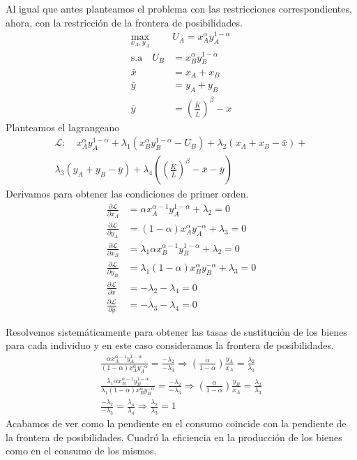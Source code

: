 Al igual que antes planteamos el problema con las restricciones correspondientes, ahora, con la restricción de la frontera de posibilidades.
\begin{align*}
    \max _{x_A,y_A} \quad & U_A = x_A^\alpha y_A^{1-\alpha} \\
    \text{s.a} \quad  U_B&= x_B^\alpha y_B^{1-\alpha} \\
     \bar{x} &= x_A + x_B \\
    \bar{y} &= y_A + y_B \\
    \bar{y} &= \left( \frac{\bar{K}}{\bar{L}} \right)^\beta - x 
\end{align*}
Planteamos el lagrangeano
\begin{align*}
    \mathcal{L}:\quad x_A^\alpha y_A^{1-\alpha} + \lambda_1 (x_B^\alpha y_B^{1-\alpha} - U_B) + \lambda_2 (x_A + x_B - \bar{x}) + \\ \lambda_3 (y_A + y_B - \bar{y}) + \lambda_4 \left( \left( \frac{\bar{K}}{\bar{L}} \right)^\beta - \bar{x} - \bar{y} \right)
\end{align*}
Derivamos para obtener las condiciones de primer orden. 
\begin{align}
    \frac{\partial \mathcal{L}}{\partial x_A} &= \alpha x_A^{\alpha - 1}y_A^{1- \alpha} + \lambda_2 = 0 \\
    \frac{\partial \mathcal{L}}{\partial y_A} &= (1-\alpha)x_A^\alpha y_A^{-\alpha} + \lambda_3 = 0 \\
    \frac{\partial \mathcal{L}}{\partial x_B} &= \lambda_1\alpha x_B ^{\alpha - 1}y_B ^{1-\alpha} + \lambda_2 = 0 \\
    \frac{\partial \mathcal{L}}{\partial y_B} &= \lambda_1(1-\alpha) x_B^{\alpha} y_B^{-\alpha} + \lambda_3 = 0 \\
    \frac{\partial \mathcal{L}}{\partial \bar{x}} &= - \lambda_2 - \lambda_4 = 0 \\
    \frac{\partial \mathcal{L}}{\partial \bar{y}} &= - \lambda_3 - \lambda_4 = 0
\end{align}

Resolvemos sistemáticamente para obtener las tasas de sustitución de los bienes para cada individuo y en este caso consideramos la frontera de posibilidades.
\begin{align}
    \frac{\alpha x_A^{\alpha - 1}y_A^{1- \alpha}}{(1-\alpha)x_A^\alpha y_A^{-\alpha}}  = \frac{-\lambda_2}{-\lambda_3} \Longrightarrow \left( \frac{\alpha}{1-\alpha} \right) \frac{y_A}{x_A} = \frac{\lambda_2}{\lambda_3} \\
    \frac{\lambda_1\alpha x_B ^{\alpha - 1}y_B ^{1-\alpha} }{\lambda_1(1-\alpha) x_B^{\alpha} y_B^{-\alpha} } = \frac{-\lambda_2}{-\lambda_3} \Longrightarrow \left( \frac{\alpha}{1-\alpha} \right) \frac{y_B}{x_A} = \frac{\lambda_2}{\lambda_3} \\
    \frac{-\lambda_2}{-\lambda_3} = \frac{\lambda_4}{\lambda_4} \Longrightarrow \frac{\lambda_2}{\lambda_3} = 1
\end{align}
Acabamos de ver como la pendiente en el consumo coincide con la pendiente de la frontera de posibilidades. Cuadró la eficiencia en la producción de los bienes como en el consumo de los mismos.


